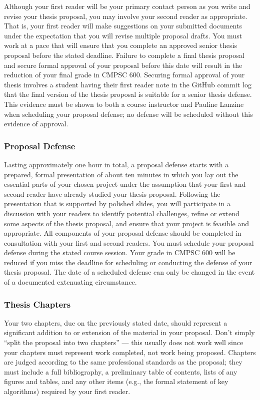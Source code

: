 \documentclass[11pt]{article}
\begin{document}
Although your first reader will be your primary contact person as you write and revise your thesis proposal, you may involve your second reader as appropriate. That is, your first reader will make suggestions on your submitted documents under the expectation that you will revise multiple proposal drafts. You must work at a pace that will ensure that you complete an approved senior thesis proposal before the stated deadline. Failure to complete a final thesis proposal and secure formal approval of your proposal before this date will result in the reduction of your final grade in CMPSC 600. Securing formal approval of your thesis involves a student having their first reader note in the GitHub commit log that the final version of the thesis proposal is suitable for a senior thesis defense. This evidence must be shown to both a course instructor and Pauline Lanzine when scheduling your proposal defense; no defense will be scheduled without this evidence of approval.

\subsubsection*{Proposal Defense}

Lasting approximately one hour in total, a proposal defense starts with a prepared, formal presentation of about ten minutes in which you lay out the
essential parts of your chosen project under the assumption that your first and second reader have already studied your thesis proposal. Following the
presentation that is supported by polished slides, you will participate in a discussion with your readers to identify potential challenges, refine or extend some aspects of the thesis proposal, and ensure that your project is feasible and appropriate. All components of your proposal defense should be completed in consultation with your first and second readers. You must schedule your proposal defense during the stated course session. Your grade in CMPSC 600 will be reduced if you miss the deadline for scheduling or conducting the defense of your thesis proposal. The date of a scheduled defense can only be changed in the event of a documented extenuating circumstance.

\subsubsection*{Thesis Chapters}

Your two chapters, due on the previously stated date, should represent a significant addition to or extension of the material in your proposal. Don't
simply ``split the proposal into two chapters'' --- this usually does not work well since your chapters must represent work completed, not work being proposed. Chapters are judged according to the same professional standards as the proposal; they must include a full bibliography, a preliminary table of contents, lists of any figures and tables, and any other items (e.g., the formal statement of key algorithms) required by your first reader.
\end{document}
